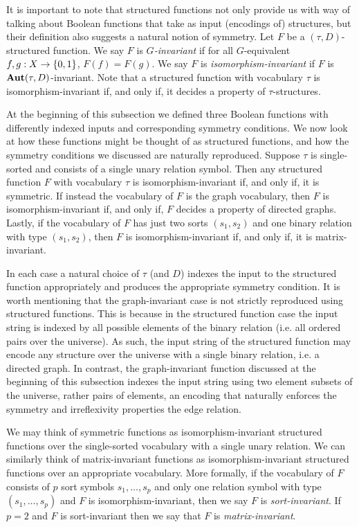 \documentclass[../main/thesis.tex]{subfiles}
\begin{document}
It is important to note that structured functions not only provide us with way
of talking about Boolean functions that take as input (encodings of) structures,
but their definition also suggests a natural notion of symmetry. Let $F$ be a
$(\tau, D)$-structured function. We say $F$ is \emph{$G$-invariant} if for all
$G$-equivalent $f, g : X \rightarrow \{0,1\}$, $F(f) = F(g)$. We say $F$ is
\emph{isomorphism-invariant} if $F$ is $\text{\textbf{Aut}}(\tau, D)$-invariant. Note that a
structured function with vocabulary $\tau$ is isomorphism-invariant if, and only
if, it decides a property of $\tau$-structures.

At the beginning of this subsection we defined three Boolean functions with
differently indexed inputs and corresponding symmetry conditions. We now look at
how these functions might be thought of as structured functions, and how the
symmetry conditions we discussed are naturally reproduced. Suppose $\tau$ is
single-sorted and consists of a single unary relation symbol. Then any
structured function $F$ with vocabulary $\tau$ is isomorphism-invariant if, and
only if, it is symmetric. If instead the vocabulary of $F$ is the graph
vocabulary, then $F$ is isomorphism-invariant if, and only if, $F$ decides a
property of directed graphs. Lastly, if the vocabulary of $F$ has just two sorts
$(s_1, s_2)$ and one binary relation with type $(s_1, s_2)$, then $F$ is
isomorphism-invariant if, and only if, it is matrix-invariant.

In each case a natural choice of $\tau$ (and $D$) indexes the input to the
structured function appropriately and produces the appropriate symmetry
condition. It is worth mentioning that the graph-invariant case is not strictly
reproduced using structured functions. This is because in the structured
function case the input string is indexed by all possible elements of the binary
relation (i.e. all ordered pairs over the universe). As such, the input string
of the structured function may encode any structure over the universe with a
single binary relation, i.e. a directed graph. In contrast, the graph-invariant
function discussed at the beginning of this subsection indexes the input string
using two element subsets of the universe, rather pairs of elements, an encoding
that naturally enforces the symmetry and irreflexivity properties the edge
relation.

We may think of symmetric functions as isomorphism-invariant structured
functions over the single-sorted vocabulary with a single unary relation. We can
similarly think of matrix-invariant functions as isomorphism-invariant
structured functions over an appropriate vocabulary. More formally, if the
vocabulary of $F$ consists of $p$ sort symbols $s_1, \ldots , s_p$ and only one
relation symbol with type $(s_1, \ldots, s_p)$ and $F$ is isomorphism-invariant,
then we say $F$ is \emph{sort-invariant}. If $p = 2$ and $F$ is sort-invariant
then we say that $F$ is \emph{matrix-invariant}.
\end{document}
